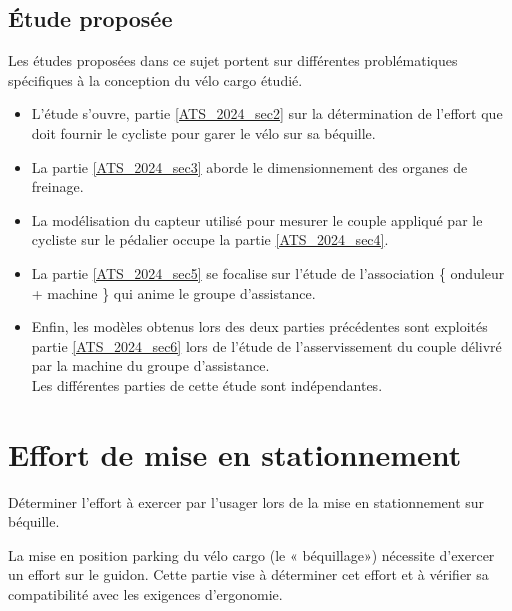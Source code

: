 \subsection{Étude proposée}
Les études proposées dans ce sujet portent sur différentes problématiques spécifiques à la conception du vélo cargo étudié.

\begin{itemize}
  \item L'étude s'ouvre, partie \ref{ATS_2024_sec2} sur la détermination de l'effort que doit fournir le cycliste pour garer le vélo sur sa béquille.
  \item La partie \ref{ATS_2024_sec3} aborde le dimensionnement des organes de freinage.
  \item La modélisation du capteur utilisé pour mesurer le couple appliqué par le cycliste sur le pédalier occupe la partie \ref{ATS_2024_sec4}.
  \item La partie \ref{ATS_2024_sec5} se focalise sur l'étude de l'association \{ onduleur + machine \} qui anime le groupe d'assistance.
  \item Enfin, les modèles obtenus lors des deux parties précédentes sont exploités partie \ref{ATS_2024_sec6} lors de l'étude de l'asservissement du couple délivré par la machine du groupe d'assistance.\\
Les différentes parties de cette étude sont indépendantes.
\end{itemize}


\section{Effort de mise en stationnement \label{ATS_2024_sec2}}

\begin{obj}
Déterminer l'effort à exercer par l'usager lors de la mise en stationnement sur béquille.
\end{obj}

La mise en position parking du vélo cargo (le « béquillage») nécessite d'exercer un effort sur le guidon. Cette partie vise à déterminer cet effort et à vérifier sa compatibilité avec les exigences d'ergonomie.\\

